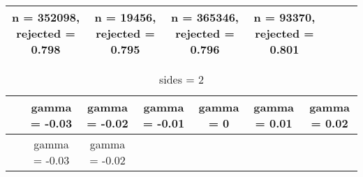 \documentclass[
]{article}
\begin{document}
\begin{longtable}[]{@{}ccccccc@{}}
\begin{minipage}[t]{0.13\columnwidth}
n = 352098, rejected = 0.798\strut
\end{minipage} & \begin{minipage}[t]{0.12\columnwidth}\centering
n = 19456, rejected = 0.795\strut
\end{minipage} & \begin{minipage}[t]{0.13\columnwidth}\centering
n = 365346, rejected = 0.796\strut
\end{minipage} & \begin{minipage}[t]{0.13\columnwidth}\centering
n = 93370, rejected = 0.801\strut
\end{minipage}\tabularnewline
\bottomrule
\end{longtable}

\begin{longtable}[]{@{}ccccccc@{}}
\caption{sides = 2}\tabularnewline
\toprule
\begin{minipage}[b]{0.09\columnwidth}\centering
~\strut
\end{minipage} & \begin{minipage}[b]{0.08\columnwidth}\centering
gamma = -0.03\strut
\end{minipage} & \begin{minipage}[b]{0.08\columnwidth}\centering
gamma = -0.02\strut
\end{minipage} & \begin{minipage}[b]{0.08\columnwidth}\centering
gamma = -0.01\strut
\end{minipage} & \begin{minipage}[b]{0.15\columnwidth}\centering
gamma = 0\strut
\end{minipage} & \begin{minipage}[b]{0.16\columnwidth}\centering
gamma = 0.01\strut
\end{minipage} & \begin{minipage}[b]{0.16\columnwidth}\centering
gamma = 0.02\strut
\end{minipage}\tabularnewline
\midrule
\endfirsthead
\toprule
\begin{minipage}[b]{0.09\columnwidth}\centering
~\strut
\end{minipage} & \begin{minipage}[b]{0.08\columnwidth}\centering
gamma = -0.03\strut
\end{minipage} & \begin{minipage}[b]{0.08\columnwidth}\centering
gamma = -0.02\strut
\end{minipage} & \begin{minipage}[b]{0.08\columnwidth}\centering

\end{minipage}
\end{longtable}
\end{document}
